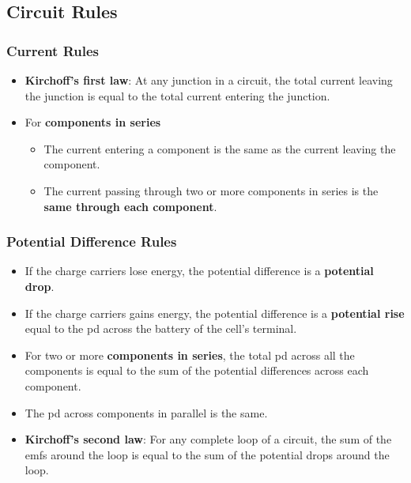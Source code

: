 \subsection{Circuit Rules}

\subsubsection*{Current Rules}

\begin{itemize}
    \item \textbf{Kirchoff's first law}: At any junction in a circuit, the total current leaving the junction is equal to the total current entering the junction.
    \item For \textbf{components in series}
        \begin{itemize}
            \item The current entering a component is the same as the current leaving the component.
            \item The current passing through two or more components in series is the \textbf{same through each component}.
        \end{itemize}
\end{itemize}

\subsubsection*{Potential Difference Rules}

\begin{itemize}
    \item If the charge carriers lose energy, the potential difference is a \textbf{potential drop}.
    \item If the charge carriers gains energy, the potential difference is a \textbf{potential rise} equal to the pd across the battery of the cell's terminal.
    \item For two or more \textbf{components in series}, the total pd across all the components is equal to the sum of the potential differences across each component.
    \item The pd across components in parallel is the same.
    \item \textbf{Kirchoff's second law}: For any complete loop of a circuit, the sum of the emfs around the loop is equal to the sum of the potential drops around the loop.
\end{itemize}
